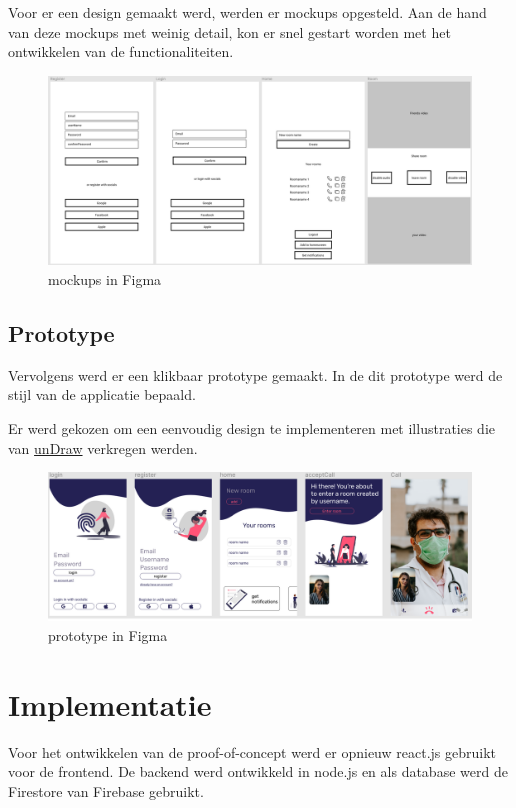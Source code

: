 			Voor er een design gemaakt werd, werden er mockups opgesteld.
			Aan de hand van deze mockups met weinig detail, kon er snel gestart worden met het ontwikkelen van de functionaliteiten. \autocite{Tate2019}
			\begin{figure}[H]
				\centering
				\includegraphics[width=140mm]{./img/mockup-poc.png}{}
				\caption{mockups in Figma}
			\end{figure}
		
		
		\subsection{Prototype}
		
			Vervolgens werd er een klikbaar prototype gemaakt. In de dit prototype werd de stijl van de applicatie bepaald.
			
			Er werd gekozen om een eenvoudig design te implementeren met illustraties die van \href{https://undraw.co/}{unDraw} verkregen werden.
			
			\begin{figure}[H]
				\centering
				\includegraphics[width=140mm]{./img/prototype-poc.png}{}
				\caption{prototype in Figma}
			\end{figure}
			
	
\section{Implementatie}
	Voor het ontwikkelen van de proof-of-concept werd er opnieuw react.js gebruikt voor de frontend. De backend werd ontwikkeld in node.js en als database werd de Firestore van Firebase gebruikt.
	
